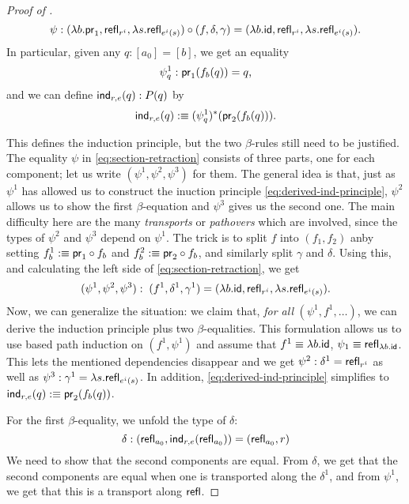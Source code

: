\begin{proof}[Proof of ]
 \begin{equation} \label{eq:section-retraction}
  \psi: (\lambda b. \mathsf{pr}_1,\mathsf{refl}_{r^i},\lambda s. \mathsf{refl}_{e^i(s)}) \circ (f, \delta, \gamma)
   = (\lambda b. \mathsf{id}, \mathsf{refl}_{r^i}, \lambda s. \mathsf{refl}_{e^i(s)}) \text{.}
 \end{equation}
In particular, given any $q : [a_0] = [b]$, we get an equality
 \begin{equation} \label{eq:proj1-f}
  \psi^1_q : \mathsf{pr}_1(f_b(q)) = q \text{,}
 \end{equation}
and we can define $\mathsf{ind}_{r,e}(q) : P(q)$ by
 \begin{equation}
  \mathsf{ind}_{r,e}(q) :\equiv (\psi^1_q)^*(\mathsf{pr}_2(f_b(q))). \label{eq:derived-ind-principle}
 \end{equation}

This defines the induction principle, but the two $\beta$-rules still need to
be justified.
The equality $\psi$ in \eqref{eq:section-retraction} consists of three parts,
one for each component;
let us write $(\psi^1, \psi^2, \psi^3)$ for them.
The general idea is that, just as $\psi^1$ has allowed us to construct
the inuction principle \eqref{eq:derived-ind-principle},
$\psi^2$ allows us to show the first $\beta$-equation and $\psi^3$ gives us the
second one.
The main difficulty here are the many \emph{transports} or \emph{pathovers}
which are involved, since the types of $\psi^2$ and $\psi^3$ depend on $\psi^1$.
The trick is to split $f$ into $(f_1, f_2)$ anby setting $f_b^1 :\equiv \mathsf{pr}_1 \circ f_b$
and $f_b^2 :\equiv \mathsf{pr}_2 \circ f_b$, and similarly split $\gamma$ and $\delta$.
Using this, and calculating the left side of \eqref{eq:section-retraction}, we get
 \begin{equation*}
  (\psi^1, \psi^2, \psi^3) : \; (f^1, \delta^1, \gamma^1) = (\lambda b. \mathsf{id}, \mathsf{refl}_{r^i}, \lambda s. \mathsf{refl}_{e^i(s)}) \text{.}
 \end{equation*}
 Now, we can generalize the situation: we claim that, \emph{for all} $(\psi^1, f^1, \ldots)$,
 we can derive the induction principle plus two $\beta$-equalities.
 This formulation allows us to use based path induction on $(f^1, \psi^1)$ and
 assume that $f^1 \equiv \lambda b.\mathsf{id}$, $\psi_1 \equiv \mathsf{refl}_{\lambda b.\mathsf{id}}$.
 This lets the mentioned dependencies disappear and we get $\psi^2 : \delta^1 = \mathsf{refl}_{r^i}$ 
 as well as $\psi^3 : \gamma^1 = \lambda s.\mathsf{refl}_{e^i(s)}$.
 In addition, \eqref{eq:derived-ind-principle} simplifies to $\mathsf{ind}_{r,e}(q) :\equiv \mathsf{pr}_2(f_b(q))$.

 For the first $\beta$-equality, we unfold the type of $\delta$:
 \begin{equation*}
  \delta : (\mathsf{refl}_{a_0}, \mathsf{ind}_{r,e}(\mathsf{refl}_{a_0})) = (\mathsf{refl}_{a_0}, r)
 \end{equation*}
 We need to show that the second components are equal.
 From $\delta$, we get that the second components are equal when one is
 transported along the $\delta^1$,
 and from $\psi^1$, we get that this is a transport along $\mathsf{refl}$.



\end{proof}
